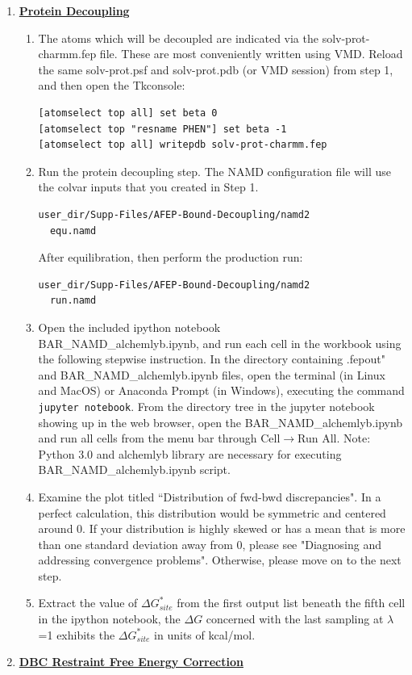 \documentclass[9pt,tutorial]{livecoms}
\begin{document}
\begin{enumerate}[left=0pt .. \parindent]
\item {\bf \hyperref[section 7]{Protein Decoupling}}
\begin{enumerate}
\item The atoms which will be decoupled are indicated via the solv-prot-charmm.fep file. These are most conveniently written using VMD. Reload the same solv-prot.psf and solv-prot.pdb (or VMD session) from step 1, and then open the Tkconsole:  
\begin{verbatim}
[atomselect top all] set beta 0
[atomselect top "resname PHEN"] set beta -1
[atomselect top all] writepdb solv-prot-charmm.fep
\end{verbatim}
\item Run the protein decoupling step. The NAMD configuration file will use the colvar inputs that you created in Step 1. 
\begin{verbatim}
user_dir/Supp-Files/AFEP-Bound-Decoupling/namd2
  equ.namd
\end{verbatim}
After equilibration, then perform the production run:
\begin{verbatim}
user_dir/Supp-Files/AFEP-Bound-Decoupling/namd2
  run.namd
\end{verbatim}
\item Open the included ipython notebook\\ BAR\_NAMD\_alchemlyb.ipynb, and run each cell in the workbook using the following stepwise instruction. %
In the directory containing .fepout" and BAR\_NAMD\_alchemlyb.ipynb files, open the terminal (in Linux and MacOS) or Anaconda Prompt (in Windows), executing the command \texttt{jupyter notebook}. From the directory tree in the jupyter notebook showing up in the web browser, open the BAR\_NAMD\_alchemlyb.ipynb and run all cells from the menu bar through Cell${\rightarrow}$Run All. Note: Python 3.0 and alchemlyb library are necessary for executing BAR\_NAMD\_alchemlyb.ipynb script. 


\item Examine the plot titled ``Distribution of fwd-bwd discrepancies". In a perfect calculation, this distribution would be symmetric and centered around 0. If your distribution is highly skewed or has a mean that is more than one standard deviation away from 0, please see "Diagnosing and addressing convergence problems". Otherwise, please move on to the next step. 
\item Extract the value of  ${\Delta G^*_{site}}$ from the first output list beneath the fifth cell in the ipython notebook, the ${\Delta G}$ concerned with the last sampling at {$\lambda$}=1 exhibits the ${\Delta G^*_{site}}$ in units of kcal/mol.
\end{enumerate}
\item {\bf \hyperref[sec:10]{DBC Restraint Free Energy Correction}}


\end{enumerate}
\end{document}
